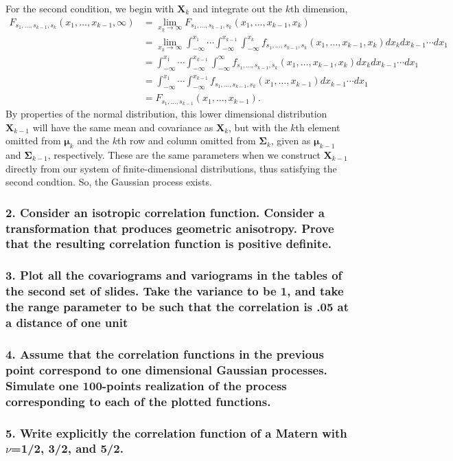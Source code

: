 \documentclass[12pt]{article}
\newcommand{\m}[1]{\mathbf{\bm{#1}}}
\begin{document}
For the second condition, we begin with $\m{X}_k$ and integrate out the $k$th dimension,
\begin{align*}
F_{s_1,\ldots,s_{k-1},s_k}(x_1,\ldots,x_{k-1},\infty) &= \lim_{x_k\rightarrow\infty} F_{s_1,\ldots,s_{k-1},s_k}(x_1,\ldots,x_{k-1},x_k) \\
&= \lim_{x_k\rightarrow\infty} \int_{-\infty}^{x_1}\cdots\int_{-\infty}^{x_{k-1}}\int_{-\infty}^{x_k}f_{s_1,\ldots,s_{k-1},s_k}(x_1,\ldots,x_{k-1},x_k)dx_kdx_{k-1}\cdots dx_1 \\
&= \int_{-\infty}^{x_1}\cdots\int_{-\infty}^{x_{k-1}}\int_{-\infty}^{\infty}f_{s_1,\ldots,s_{k-1},s_k}(x_1,\ldots,x_{k-1},x_k)dx_kdx_{k-1}\cdots dx_1 \\
&= \int_{-\infty}^{x_1}\cdots\int_{-\infty}^{x_{k-1}}f_{s_1,\ldots,s_{k-1},s_k}(x_1,\ldots,x_{k-1})dx_{k-1}\cdots dx_1 \\
&= F_{s_1,\ldots,s_{k-1}}(x_1,\ldots,x_{k-1}).
\end{align*}
By properties of the normal distribution, this lower dimensional distribution $\m{X}_{k-1}$ will have the same mean and covariance as $\m{X}_k$, but with the $k$th element omitted from $\m{\mu}_k$ and the $k$th row and column omitted from $\m{\Sigma}_k$, given as $\m{\mu}_{k-1}$ and $\m{\Sigma}_{k-1}$, respectively.  These are the same parameters when we construct $\m{X}_{k-1}$ directly from our system of finite-dimensional distributions, thus satisfying the second condtion. So, the Gaussian process exists.

\subsubsection*{2. Consider an isotropic correlation function. Consider a transformation that produces geometric anisotropy. Prove that the resulting correlation function is positive definite.}



\subsubsection*{3. Plot all the covariograms and variograms in the tables of the second set of slides. Take the variance to be 1, and take the range parameter to be such that the correlation is .05 at a distance of one unit}

\subsubsection*{4. Assume that the correlation functions in the previous point correspond to one dimensional Gaussian processes. Simulate one 100-points realization of the process corresponding to each of the plotted functions.}

\subsubsection*{5. Write explicitly the correlation function of a Matern with $\nu$=1/2, 3/2, and 5/2.}
\end{document}
